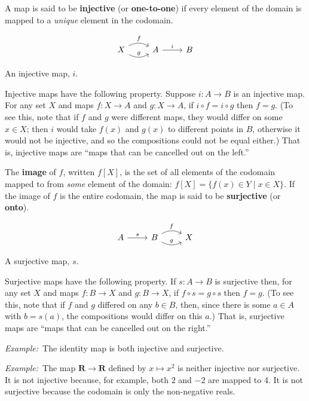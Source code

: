 \documentclass[12pt, a4paper]{article}
\newcommand{\defn}[1]{\textbf{#1}}
\newcommand{\set}[1]{\mathbold{#1}}
\newcommand{\eg}{\emph{Example:}\relax}
\begin{document}
A map is said to be \defn{injective} (or \defn{one-to-one}) if every
element of the domain is mapped to a \emph{unique} element in the
codomain.

\begin{sidefigure}
\[\begin{tikzcd}
  X \arrow[r, bend left, "f"] \arrow [r, bend right, "g"] & A \arrow[r, "i"] & B
\end{tikzcd}\]
  \caption{An injective map, $i$.\label{fig:injection}}
\end{sidefigure}
Injective maps have the following property. Suppose $i\colon A\to B$ is
an injective map. For any set $X$ and maps $f\colon X\to A$ and $g\colon
X\to A$, if $i\circ f = i\circ g$ then $f = g$. (To see this, note that if $f$
and $g$ were different maps, they would differ on some $x \in X$; then
$i$ would take $f(x)$ and $g(x)$ to different points in $B$, otherwise
it would not be injective, and so the compositions could not be equal
either.) That is, injective maps are “maps that can be cancelled out
on the left.”

The \defn{image} of $f$, written $f[X]$, is the set of all elements of
the codomain mapped to from \emph{some} element of the domain: $f[X] =
\{f(x) \in Y \mid x\in X\}$. If the image of $f$ is the entire codomain, the
map is said to be \defn{surjective} (or \defn{onto}).

\begin{sidefigure}
\[\begin{tikzcd}
  A \arrow[r, "s"] & B \arrow[r, bend left, "f"] \arrow [r, bend right, "g"] & X 
\end{tikzcd}\]
  \caption{A surjective map, $s$.\label{fig:surjection}}
\end{sidefigure}
Surjective maps have the following property. If $s\colon A\to B$ is
surjective then, for any set $X$ and maps $f\colon B\to X$ and $g\colon
B\to X$, if $f\circ s = g\circ s$ then $f = g$. (To see this, note that if $f$
and $g$ differed on any $b\in B$, then, since there is some $a\in A$ with
$b = s(a)$, the compositions would differ on this $a$.) That is,
surjective maps are “maps that can be cancelled out on the right.”

\eg\ The identity map is both injective and surjective.

\eg\ The map $\set{R}\to\set{R}$ defined by $x\mapsto x^2$ is neither
injective nor surjective. It is not injective because, for example,
both $2$ and $-2$ are mapped to $4$. It is not surjective because the
codomain is only the non-negative reals.
\end{document}
